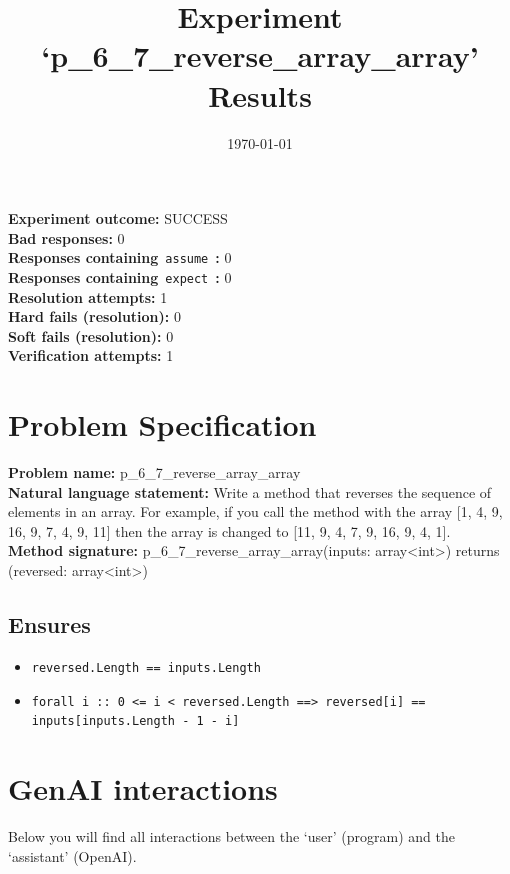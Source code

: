 \documentclass{article}
\begin{document}
\title{Experiment `p\_6\_7\_reverse\_array\_array' Results}
\author{\today}
\date{}
\maketitle
\textbf{Experiment outcome: }SUCCESS
\\\textbf{Bad responses: }0
\\\textbf{Responses containing}~\texttt{assume}~\textbf{: }0
\\\textbf{Responses containing}~\texttt{expect}~\textbf{: }0
\\\textbf{Resolution attempts: }1
\\\textbf{Hard fails (resolution): }0
\\\textbf{Soft fails (resolution): }0
\\\textbf{Verification attempts: }1
\section*{Problem Specification}
\textbf{Problem name: }p\_6\_7\_reverse\_array\_array
\\\textbf{Natural language statement: }Write a method that reverses the sequence of elements in an array. For example, if you call the method with the array [1, 4, 9, 16, 9, 7, 4, 9, 11] then the array is changed to [11, 9, 4, 7, 9, 16, 9, 4, 1].
\\\textbf{Method signature: }p\_6\_7\_reverse\_array\_array(inputs: array<int>) returns (reversed: array<int>)
\subsection*{Ensures}
\begin{itemize}
\item \texttt{reversed.Length == inputs.Length}
\item \texttt{forall i :: 0 <= i < reversed.Length ==> reversed[i] == inputs[inputs.Length - 1 - i]}
\end{itemize}
\clearpage
\section*{GenAI interactions}
Below you will find all interactions between the `user' (program) and the `assistant' (OpenAI).
\end{document}

